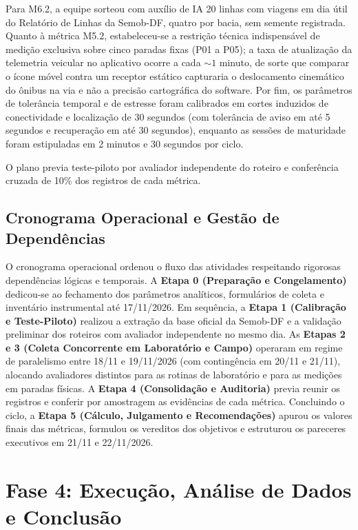 \documentclass[11pt,a4paper]{article}
\begin{document}
Para M6.2, a equipe sorteou com auxílio de IA 20 linhas com viagens em dia útil do Relatório de Linhas da Semob-DF, quatro por bacia, sem semente registrada. Quanto à métrica M5.2, estabeleceu-se a restrição técnica indispensável de medição exclusiva sobre cinco paradas fixas (P01 a P05); a taxa de atualização da telemetria veicular no aplicativo ocorre a cada $\sim 1$ minuto, de sorte que comparar o ícone móvel contra um receptor estático capturaria o deslocamento cinemático do ônibus na via e não a precisão cartográfica do software. Por fim, os parâmetros de tolerância temporal e de estresse foram calibrados em cortes induzidos de conectividade e localização de 30 segundos (com tolerância de aviso em até 5 segundos e recuperação em até 30 segundos), enquanto as sessões de maturidade foram estipuladas em 2 minutos e 30 segundos por ciclo.

O plano previa teste-piloto por avaliador independente do roteiro e conferência cruzada de 10\% dos registros de cada métrica.

\subsection{Cronograma Operacional e Gestão de Dependências}
\label{sec:cronograma}

O cronograma operacional ordenou o fluxo das atividades respeitando rigorosas dependências lógicas e temporais. A \textbf{Etapa 0 (Preparação e Congelamento)} dedicou-se ao fechamento dos parâmetros analíticos, formulários de coleta e inventário instrumental até 17/11/2026. Em sequência, a \textbf{Etapa 1 (Calibração e Teste-Piloto)} realizou a extração da base oficial da Semob-DF e a validação preliminar dos roteiros com avaliador independente no mesmo dia. As \textbf{Etapas 2 e 3 (Coleta Concorrente em Laboratório e Campo)} operaram em regime de paralelismo entre 18/11 e 19/11/2026 (com contingência em 20/11 e 21/11), alocando avaliadores distintos para as rotinas de laboratório e para as medições em paradas físicas. A \textbf{Etapa 4 (Consolidação e Auditoria)} previa reunir os registros e conferir por amostragem as evidências de cada métrica. Concluindo o ciclo, a \textbf{Etapa 5 (Cálculo, Julgamento e Recomendações)} apurou os valores finais das métricas, formulou os vereditos dos objetivos e estruturou os pareceres executivos em 21/11 e 22/11/2026.

\section{Fase 4: Execução, Análise de Dados e Conclusão}
\label{sec:fase4}
\end{document}
